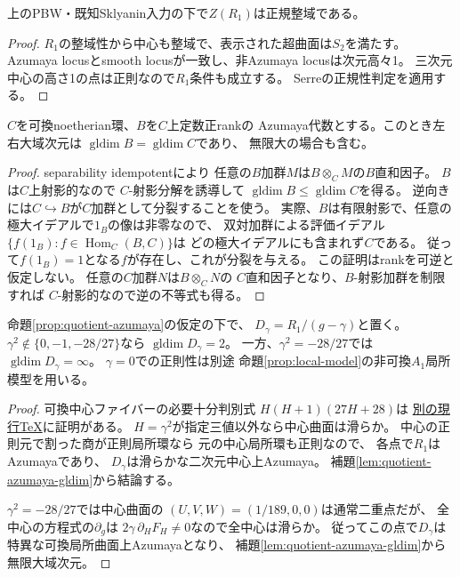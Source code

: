 \begin{corollary}[全中心の正規性]
\label{cor:quotient-normal-center}
上のPBW・既知Sklyanin入力の下で$Z(R_1)$は正規整域である。
\end{corollary}
\begin{proof}
$R_1$の整域性から中心も整域で、表示された超曲面は$S_2$を満たす。
Azumaya locusとsmooth locusが一致し、非Azumaya locusは次元高々1。
三次元中心の高さ1の点は正則なので$R_1$条件も成立する。
Serreの正規性判定を適用する。
\end{proof}


\begin{lemma}[Azumaya環と中心の大域次元]
\label{lem:quotient-azumaya-gldim}
$C$を可換noetherian環、$B$を$C$上定数正rankの
Azumaya代数とする。このとき左右大域次元は
$\operatorname{gldim}B=\operatorname{gldim}C$であり、
無限大の場合も含む。
\end{lemma}
\begin{proof}
separability idempotentにより
任意の$B$加群$M$は$B\otimes_CM$の$B$直和因子。
$B$は$C$上射影的なので
$C$-射影分解を誘導して
$\operatorname{gldim}B\le\operatorname{gldim}C$を得る。
逆向きには$C\hookrightarrow B$が$C$加群として分裂することを使う。
実際、$B$は有限射影で、任意の極大イデアルで$1_B$の像は非零なので、
双対加群による評価イデアル$\{f(1_B):f\in\operatorname{Hom}_C(B,C)\}$は
どの極大イデアルにも含まれず$C$である。
従って$f(1_B)=1$となる$f$が存在し、これが分裂を与える。
この証明はrankを可逆と仮定しない。
任意の$C$加群$N$は$B\otimes_CN$の
$C$直和因子となり、$B$-射影加群を制限すれば
$C$-射影的なので逆の不等式も得る。
\end{proof}

\begin{corollary}[可換中心ファイバーからの十分条件と一つの非正則値]
\label{cor:quotient-azumaya-fibers}
命題\ref{prop:quotient-azumaya}の仮定の下で、
$D_\gamma=R_1/(g-\gamma)$と置く。
$\gamma^2\notin\{0,-1,-28/27\}$なら
$\operatorname{gldim}D_\gamma=2$。
一方、$\gamma^2=-28/27$では
$\operatorname{gldim}D_\gamma=\infty$。
$\gamma=0$での正則性は別途
命題\ref{prop:local-model}の非可換$A_1$局所模型を用いる。
\end{corollary}
\begin{proof}
可換中心ファイバーの必要十分判別式
$H(H+1)(27H+28)$は
\href{https://github.com/uedakazushi/nc-cubic2/blob/main/papers/central_fiber_discriminant.tex}
{別の現行TeX}に証明がある。
$H=\gamma^2$が指定三値以外なら中心曲面は滑らか。
中心の正則元で割った商が正則局所環なら
元の中心局所環も正則なので、
各点で$R_1$はAzumayaであり、
$D_\gamma$は滑らかな二次元中心上Azumaya。
補題\ref{lem:quotient-azumaya-gldim}から結論する。

$\gamma^2=-28/27$では中心曲面の
$(U,V,W)=(1/189,0,0)$は通常二重点だが、
全中心の方程式の$\partial_g$は
$2\gamma\,\partial_HF_H\ne0$なので全中心は滑らか。
従ってこの点で$D_\gamma$は
特異な可換局所曲面上Azumayaとなり、
補題\ref{lem:quotient-azumaya-gldim}から無限大域次元。
\end{proof}

